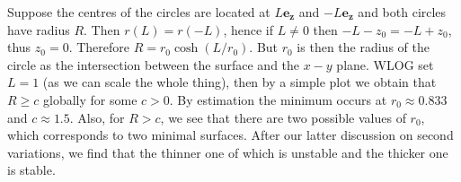 \documentclass{article}
\begin{document}
\begin{example}
    Suppose the centres of the circles are located at $L\mathbf{e_z}$ and $-L\mathbf{e_z}$ and both circles have radius $R$.
    Then $r(L)=r(-L)$, hence if $L\neq 0$ then $-L-z_0=-L+z_0$, thus $z_0=0$.
    Therefore $R=r_0\cosh(L/r_0)$.
    But $r_0$ is then the radius of the circle as the intersection between the surface and the $x-y$ plane.
    WLOG set $L=1$ (as we can scale the whole thing), then by a simple plot we obtain that $R\ge c$ globally for some $c>0$.
    By estimation the minimum occurs at $r_0\approx 0.833$ and $c\approx 1.5$.
    Also, for $R>c$, we see that there are two possible values of $r_0$, which corresponds to two minimal surfaces.
    After our latter discussion on second variations, we find that the thinner one of which is unstable and the thicker one is stable.
\end{example}

\newpage
\end{document}
